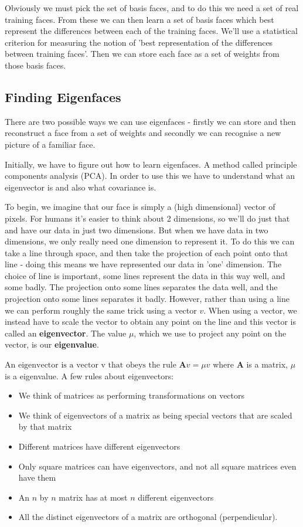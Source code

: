 \documentclass{article}
\begin{document}
	Obviously we must pick the set of basis faces, and to do this we need a set of real training faces. From these we can then learn a set of basis faces which best represent the differences between each of the training faces. We'll use a statistical criterion for measuring the notion of 'best representation of the differences between training faces'. Then we can store each face as a set of weights from those basis faces.
	
	\subsection{Finding Eigenfaces}
	There are two possible ways we can use eigenfaces - firstly we can store and then reconstruct a face from a set of weights and secondly we can recognise a new picture of a familiar face.
	
	Initially, we have to figure out how to learn eigenfaces. A method called principle components analysis (PCA). In order to use this we have to understand what an eigenvector is and also what covariance is.
	
	To begin, we imagine that our face is simply a (high dimensional) vector of pixels. For humans it's easier to think about 2 dimensions, so we'll do just that and have our data in just two dimensions. But when we have data in two dimensions, we only really need one dimension to represent it. To do this we can take a line through space, and then take the projection of each point onto that line - doing this means we have represented our data in 'one' dimension. The choice of line is important, some lines represent the data in this way well, and some badly. The projection onto some lines separates the data well, and the projection onto some lines separates it badly. However, rather than using a line we can perform roughly the same trick using a vector $v$. When using a vector, we instead have to scale the vector to obtain any point on the line and this vector is called an \textbf{eigenvector}. The value $\mu$, which we use to project any point on the vector, is our \textbf{eigenvalue}.
	
		$\text{An eigenvector is a vector v that obeys the rule } \mathbf{A}v = \mu v$ where $\mathbf{A}$ is a matrix, $\mu$ is a eigenvalue. A few rules about eigenvectors:
		\begin{itemize}
			\item We think of matrices as performing transformations on vectors
			\item We think of eigenvectors of a matrix as being special vectors that are scaled by that matrix
			\item Different matrices have different eigenvectors
			\item Only square matrices can have eigenvectors, and not all square matrices even have them
			\item An $n$ by $n$ matrix has at most $n$ different eigenvectors
			\item All the distinct eigenvectors of a matrix are orthogonal (perpendicular).
		\end{itemize}
		
\end{document}
